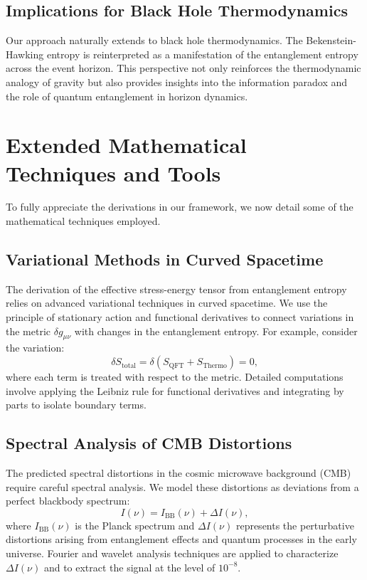 \documentclass[12pt, a4paper]{article}
\begin{document}
\subsection{Implications for Black Hole Thermodynamics}
Our approach naturally extends to black hole thermodynamics. The Bekenstein-Hawking entropy is reinterpreted as a manifestation of the entanglement entropy across the event horizon. This perspective not only reinforces the thermodynamic analogy of gravity but also provides insights into the information paradox and the role of quantum entanglement in horizon dynamics.

\section{Extended Mathematical Techniques and Tools}
To fully appreciate the derivations in our framework, we now detail some of the mathematical techniques employed.

\subsection{Variational Methods in Curved Spacetime}
The derivation of the effective stress-energy tensor from entanglement entropy relies on advanced variational techniques in curved spacetime. We use the principle of stationary action and functional derivatives to connect variations in the metric \( \delta g_{\mu\nu} \) with changes in the entanglement entropy. For example, consider the variation:
\begin{equation}
    \delta S_{\text{total}} = \delta \left( S_{\text{QFT}} + S_{\text{Thermo}} \right) = 0,
\end{equation}
where each term is treated with respect to the metric. Detailed computations involve applying the Leibniz rule for functional derivatives and integrating by parts to isolate boundary terms.

\subsection{Spectral Analysis of CMB Distortions}
The predicted spectral distortions in the cosmic microwave background (CMB) require careful spectral analysis. We model these distortions as deviations from a perfect blackbody spectrum:
\begin{equation}
    I(\nu) = I_{\text{BB}}(\nu) + \Delta I(\nu),
\end{equation}
where \( I_{\text{BB}}(\nu) \) is the Planck spectrum and \( \Delta I(\nu) \) represents the perturbative distortions arising from entanglement effects and quantum processes in the early universe. Fourier and wavelet analysis techniques are applied to characterize \( \Delta I(\nu) \) and to extract the signal at the level of \(10^{-8}\).
\end{document}
